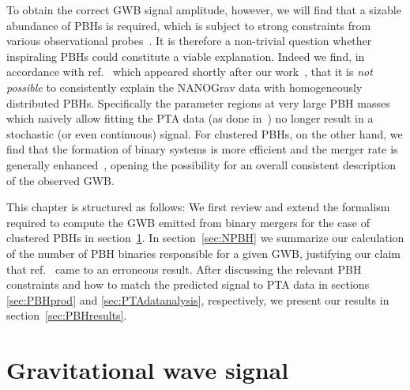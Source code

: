 To obtain the correct \ac{GWB} signal amplitude, however, we will find that a sizable abundance of \acp{PBH} is required, which is subject to strong constraints from  various observational probes~\cite{Carr:2020gox}. It is therefore a non-trivial question whether inspiraling \acp{PBH} could constitute a viable explanation. Indeed we find, in accordance with ref.~\cite{Gouttenoire:2023nzr} which appeared shortly after our work~\cite{Depta:2023qst}, that it is \textit{not possible} to consistently explain the \ac{NANOGrav} data with homogeneously distributed \acp{PBH}. Specifically the parameter regions at very large \ac{PBH} masses which naively allow fitting the \ac{PTA} data (as done in~\cite{Atal:2020yic}) no longer result in a stochastic (or even continuous) signal. For clustered \acp{PBH}, on the other hand, we find that the formation of binary systems is more efficient and the merger rate is generally enhanced~\cite{Bringmann:2018mxj}, opening the possibility for an overall consistent description of the observed \ac{GWB}.

This chapter is structured as follows: We first review and extend the formalism required to compute the \ac{GWB} emitted from binary mergers for the case of clustered \acp{PBH} in section~\ref{sec:GWBfromPBH}. In section~\ref{sec:NPBH} we summarize our calculation of the number of \ac{PBH} binaries responsible for a given \ac{GWB}, justifying our claim  that ref.~\cite{Atal:2020yic} came to an erroneous result. After discussing the relevant \ac{PBH} constraints and how to match the predicted signal to \ac{PTA} data in sections \ref{sec:PBHprod} and \ref{sec:PTAdatanalysis}, respectively, we present our results in section~\ref{sec:PBHresults}.



\section{Gravitational wave signal} \label{sec:GWBfromPBH}

